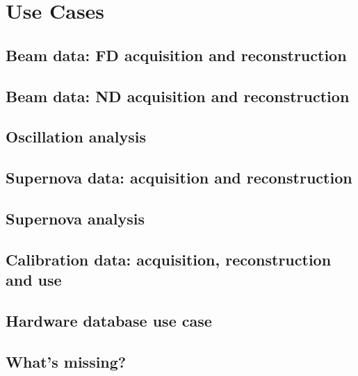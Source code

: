 \chapter{Use Cases}
\label{ch:use}

\section{Beam data: FD acquisition and reconstruction}
\label{sec:use:fdbeam}  %

\section{Beam data: ND acquisition and reconstruction}
\label{sec:use:ndbeam}  %

\section{Oscillation analysis}
\label{sec:use:osc}

\section{Supernova data: acquisition and reconstruction}
\label{sec:use:nova}  %

\section{Supernova analysis}
\label{sec:use:novaanalysis}

\section{Calibration data: acquisition, reconstruction and use}
\label{sec:use:calib}  %

\section{Hardware database use case}
\label{sec:use:hdb} 

\section{What's missing?}
\label{sec:use:todo}






